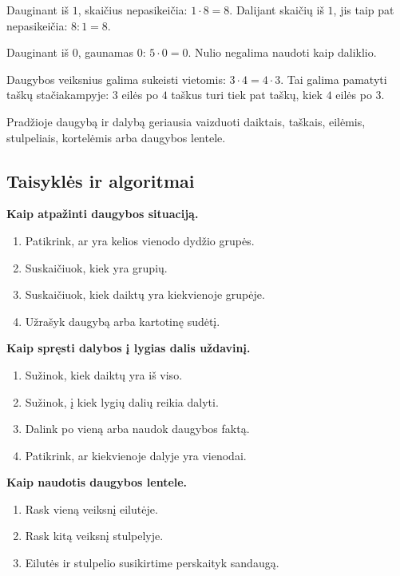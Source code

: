\begin{savybe}
Dauginant iš \(1\), skaičius nepasikeičia: \(1\cdot 8=8\). Dalijant skaičių iš \(1\), jis taip pat nepasikeičia: \(8:1=8\).
\end{savybe}

\begin{savybe}
Dauginant iš \(0\), gaunamas \(0\): \(5\cdot 0=0\). Nulio negalima naudoti kaip daliklio.
\end{savybe}

\begin{savybe}
Daugybos veiksnius galima sukeisti vietomis: \(3\cdot 4=4\cdot 3\). Tai galima pamatyti taškų stačiakampyje: \(3\) eilės po \(4\) taškus turi tiek pat taškų, kiek \(4\) eilės po \(3\).
\end{savybe}

\begin{pastaba}
Pradžioje daugybą ir dalybą geriausia vaizduoti daiktais, taškais, eilėmis, stulpeliais, kortelėmis arba daugybos lentele.
\end{pastaba}

\subsection{Taisyklės ir algoritmai}

\textbf{Kaip atpažinti daugybos situaciją.}
\begin{enumerate}
\item Patikrink, ar yra kelios vienodo dydžio grupės.
\item Suskaičiuok, kiek yra grupių.
\item Suskaičiuok, kiek daiktų yra kiekvienoje grupėje.
\item Užrašyk daugybą arba kartotinę sudėtį.
\end{enumerate}

\textbf{Kaip spręsti dalybos į lygias dalis uždavinį.}
\begin{enumerate}
\item Sužinok, kiek daiktų yra iš viso.
\item Sužinok, į kiek lygių dalių reikia dalyti.
\item Dalink po vieną arba naudok daugybos faktą.
\item Patikrink, ar kiekvienoje dalyje yra vienodai.
\end{enumerate}

\textbf{Kaip naudotis daugybos lentele.}
\begin{enumerate}
\item Rask vieną veiksnį eilutėje.
\item Rask kitą veiksnį stulpelyje.
\item Eilutės ir stulpelio susikirtime perskaityk sandaugą.
\end{enumerate}

